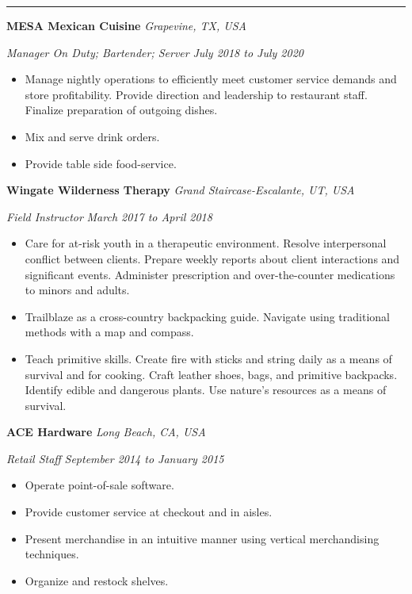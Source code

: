 \documentclass[10pt, a4paper]{article}
\newcommand{\rangesep}{to\xspace}  %
\renewcommand{\date}[1]{\textit{#1}}
\newcommand{\location}[1]{\textit{#1}}
\newcommand{\heading}[1]{
    \makebox[0pt][l]{\Large \sc \hspace{2pt}#1}
    \rule[-0.7ex]{\columnwidth}{0.5pt}\vspace{1.0ex}
}
\newcommand{\subheading}[1]{{\bfseries #1}}
\newcommand{\subheadSkip}{\vspace{0.7ex}}
\newenvironment{mysection}[1]
{\vspace{2.5ex}
\heading{#1}
\begin{adjustwidth}{0.3cm}{0cm}}
{\end{adjustwidth} }
\begin{document}
    \newpage
    \begin{mysection}{Employment \large{(continued)}}

        \subheadSkip
        \subheading{MESA Mexican Cuisine} \hfill \location{Grapevine, TX, USA}

        \textit{Manager On Duty; Bartender; Server} \hfill \date{July 2018 \rangesep July 2020}

        \begin{itemize}
            \item Manage nightly operations to efficiently meet customer service demands and store profitability. Provide direction and leadership to restaurant staff. Finalize preparation of outgoing dishes.
            \item Mix and serve drink orders.
            \item Provide table side food-service.
        \end{itemize}

        \subheadSkip
        \subheading{Wingate Wilderness Therapy} \hfill \location{Grand Staircase-Escalante, UT, USA}

        \vspace{0.1ex}
        \textit{Field Instructor} \hfill \date{March 2017 \rangesep April 2018}
        \begin{itemize}
            \item Care for at-risk youth in a therapeutic environment. Resolve interpersonal conflict between clients. Prepare weekly reports about client interactions and significant events. Administer prescription and over-the-counter medications to minors and adults.
            \item Trailblaze as a cross-country backpacking guide. Navigate using traditional methods with a map and compass.
            \item Teach primitive skills. Create fire with sticks and string daily as a means of survival and for cooking. Craft leather shoes, bags, and primitive backpacks. Identify edible and dangerous plants. Use nature's resources as a means of survival.
        \end{itemize}

        \subheadSkip
        \subheading{ACE Hardware} \hfill \location{Long Beach, CA, USA}

        \vspace{0.1ex}
        \textit{Retail Staff} \hfill \date{September 2014 \rangesep January 2015}
        \begin{itemize}
            \item Operate point-of-sale software.
            \item Provide customer service at checkout and in aisles.
            \item Present merchandise in an intuitive manner using vertical merchandising techniques.
            \item Organize and restock shelves.
        \end{itemize}
    \end{mysection} 
\end{document}
